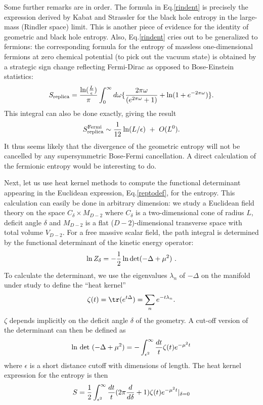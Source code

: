 \documentclass[12pt]{article}
\begin{document}
Some further remarks are in order. The formula in Eq.\ref{rindent} is precisely
the expression derived by Kabat and Strassler \cite{kabat} for the black hole
entropy in the large-mass (Rindler space) limit. This is another piece of
evidence for the identity of geometric and black hole entropy. Also,
Eq.\ref{rindent} cries out to be generalized to fermions: the corresponding
formula for the entropy of massless one-dimensional fermions at zero chemical
potential (to pick out the vacuum state) is obtained by a strategic sign
change reflecting Fermi-Dirac as opposed to Bose-Einstein statistics:
\begin{equation}
S_{\rm replica} = {\ln({L\over\epsilon})\over\pi}
\int_0^\infty d\omega \{
{2\pi\omega\over(e^{2\pi\omega}+1)}+\ln(1+e^{-2\pi\omega})\}.
\label{rindferment}
\end{equation}
This integral can also be done exactly, giving the result
\begin{equation}
	S_{\rm replica}^{\rm Fermi}\sim {1\over 12} \ln(L/\epsilon)~+~O(L^0).
\end{equation}
It thus seems likely that the divergence of the geometric entropy will not
be cancelled by any supersymmetric Bose-Fermi cancellation. A direct
calculation
of the fermionic entropy would be interesting to do.

Next, let us use heat kernel methods to compute the functional determinant
appearing in the Euclidean expression, Eq.\ref{reptodef}, for the entropy.
This calculation can easily be done in arbitrary dimension: we study
a Euclidean field theory on the space $C_\delta\times M_{D-2}$ where
$C_\delta$ is a two-dimensional cone of radius $L$, deficit angle
$\delta$ and $M_{D-2}$ is a flat ($D-2$)-dimensional transverse space with
total volume $V_{D-2}$. For a free massive scalar field, the path integral is
determined by the functional determinant of the kinetic energy operator:
\begin{equation}
\ln Z_\delta = -{1\over 2}\ln {\rm det}(-\Delta+\mu^2)~.
\end{equation}
To calculate the determinant, we use the eigenvalues $\lambda_n$ of
$-\Delta$ on the manifold under study to define the ``heat kernel''
\begin{equation}
\zeta(t)= \tr(e^{t\Delta})=\sum_n e^{-t\lambda_n}.
\end{equation}
$\zeta$ depends implicitly on the deficit angle $\delta$ of the geometry.
A cut-off version of the determinant can then be defined as
\begin{equation}
{\rm ln~det~}(-\Delta+\mu^2)=
-\int_{\epsilon^2}^\infty{dt\over t}\zeta(t)e^{-{\mu}^2 t}
\label{heatdet}
\end{equation}
where $\epsilon$ is a short distance cutoff with dimensions of length.
The heat kernel expression for the entropy is then
\begin{equation}
S = {1\over 2}\int_{\epsilon^2}^\infty{dt\over t}
(2\pi{d\over d\delta}+1) \zeta(t) e^{-{\mu}^2 t}|_{\delta=0}
\label{heatent}
\end{equation}
\end{document}
